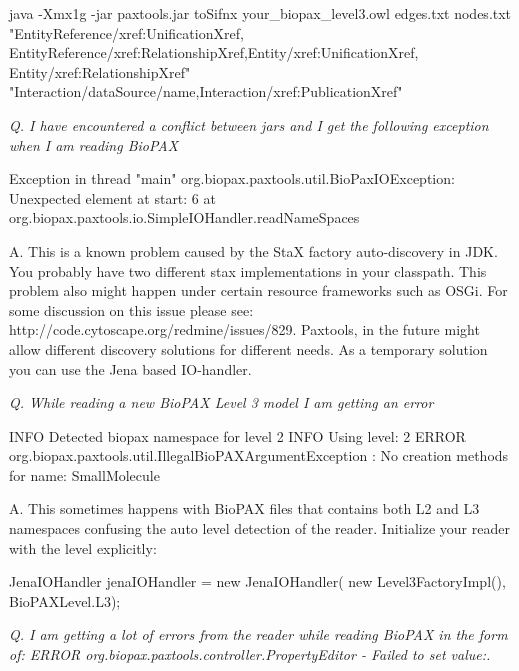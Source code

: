 \documentclass{tufte-book}
\begin{document}
\begin{xmlcode}
java -Xmx1g -jar paxtools.jar toSifnx your_biopax_level3.owl 
 edges.txt nodes.txt  "EntityReference/xref:UnificationXref,
EntityReference/xref:RelationshipXref,Entity/xref:UnificationXref,
Entity/xref:RelationshipXref"  
"Interaction/dataSource/name,Interaction/xref:PublicationXref"
\end{xmlcode}

\textit{Q. I have encountered a conflict between jars and I get the following exception when I am reading BioPAX}

\begin{fullwidth}
\begin{xmlcode}
Exception in thread "main" org.biopax.paxtools.util.BioPaxIOException:
Unexpected element at start: 6
    at org.biopax.paxtools.io.SimpleIOHandler.readNameSpaces
\end{xmlcode}
\end{fullwidth}

A. This is a known problem caused by the StaX factory auto-discovery in JDK. You probably have two different stax implementations in your classpath. This problem also might happen under certain resource frameworks such as OSGi. For some discussion on this issue please see: http://code.cytoscape.org/redmine/issues/829.  Paxtools, in the future might allow different discovery solutions for different needs. As a temporary solution you can use the Jena based IO-handler.

\textit{Q. While reading a new BioPAX Level 3 model I am getting an error}

\begin{fullwidth}
\begin{xmlcode}
INFO Detected biopax namespace for level 2
INFO Using level: 2
ERROR org.biopax.paxtools.util.IllegalBioPAXArgumentException
	: No creation methods for name: SmallMolecule 
\end{xmlcode}
\end{fullwidth}
A. This sometimes happens with BioPAX files that contains both L2 and L3 namespaces confusing the auto level detection of the reader. Initialize your reader with the level explicitly:

\begin{javacode}
 JenaIOHandler jenaIOHandler = 
  new JenaIOHandler(
   new Level3FactoryImpl(), BioPAXLevel.L3);
\end{javacode}


\textit{Q. I am getting a lot of errors from the reader while reading BioPAX in the form of: ERROR org.biopax.paxtools.controller.PropertyEditor  - Failed to set value:.} 
\end{document}
